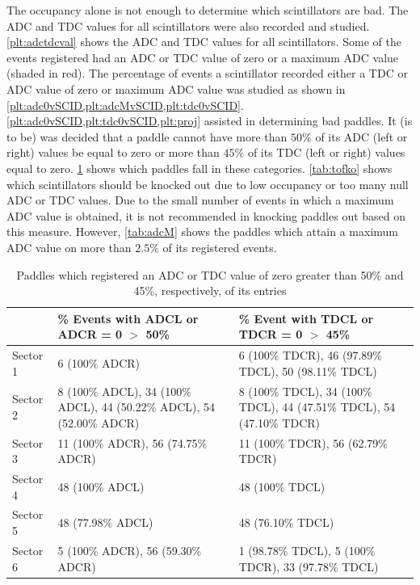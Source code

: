 The occupancy alone is not enough to determine which scintillators are bad. The ADC and TDC values for all scintillators were also recorded and studied. \ref{plt:adctdcval} shows the ADC and TDC values for all scintillators. Some of the events registered had an ADC or TDC value of zero or a maximum ADC value (shaded in red). The percentage of events a scintillator recorded either a TDC or ADC value of zero or maximum ADC value was studied as shown in \ref{plt:adc0vSCID,plt:adcMvSCID,plt:tdc0vSCID}. \ref{plt:adc0vSCID,plt:tdc0vSCID,plt:proj} assisted in determining bad paddles. It (is to be) was decided that a paddle cannot have more than $50\%$ of its ADC (left or right) values be equal to zero or more than $45\%$ of its TDC (left or right) values equal to zero. \ref{tab:adctdc0} shows which paddles fall in these categories. \ref{tab:tofko} shows which scintillators should be knocked out due to low occupancy or too many null ADC or TDC values. Due to the small number of events in which a maximum ADC value is obtained, it is not recommended in knocking paddles out based on this measure. However, \ref{tab:adcM} shows the paddles which attain a maximum ADC value on more than $2.5\%$ of its registered events.

\begin{table}
\begin{tabular}{l|p{}|p{}} %
 &  \% Events with ADCL or ADCR = 0 \( > \) 50\% &  \% Event with TDCL or TDCR = 0 \( > \) 45\% \\ 
\hline
Sector 1 & 6 (100\% ADCR) & 6 (100\% TDCR), 46 (97.89\% TDCL), 50 (98.11\% TDCL) \\
Sector 2 & 8 (100\% ADCL), 34 (100\% ADCL), 44 (50.22\% ADCL), 54 (52.00\% ADCR) &  8 (100\% TDCL), 34 (100\% TDCL), 44 (47.51\% TDCL), 54 (47.10\% TDCR)\\
Sector 3 & 11 (100\% ADCR), 56 (74.75\% ADCR) & 11 (100\% TDCR), 56 (62.79\% TDCR)\\
Sector 4 & 48 (100\% ADCL) & 48 (100\% TDCL) \\
Sector 5 & 48 (77.98\% ADCL) & 48 (76.10\% TDCL)\\
Sector 6 & 5 (100\% ADCR), 56 (59.30\% ADCR) & 1 (98.78\% TDCL), 5 (100\% TDCR), 33 (97.78\% TDCL)
\end{tabular}
\caption{Paddles which registered an ADC or TDC value of zero greater than 50\% and 45\%, respectively, of its entries}
\label{tab:adctdc0}
\end{table}


